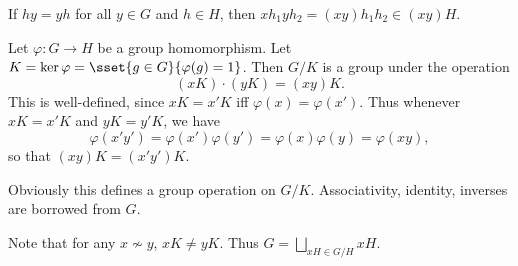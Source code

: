If $hy = yh$ for all $y \in G$ and $h \in H$, then
$xh_1yh_2 = (xy)h_1h_2 \in (xy)H$.

\begin{example}
    Let $\varphi\colon G \to H$ be a group homomorphism.
    Let $K = \ker \varphi = \sset{g \in G}{\varphi(g) = 1}$.
    Then $G/K$ is a group under the operation \[
        (xK) \cdot (yK) = (xy)K.
    \] This is well-defined, since $xK = x'K$ iff
    $\varphi(x) = \varphi(x')$.
    Thus whenever $xK = x'K$ and $yK = y'K$, we have \[
        \varphi(x'y') = \varphi(x')\varphi(y')
            = \varphi(x)\varphi(y)
            = \varphi(xy),
    \]
    so that $(xy)K = (x'y')K$.

    Obviously this defines a group operation on $G/K$.
    Associativity, identity, inverses are borrowed from $G$.

    Note that for any $x \nsim y$, $xK \ne yK$.
    Thus $G = \bigsqcup\limits_{xH \in G/H} xH$.
\end{example}
